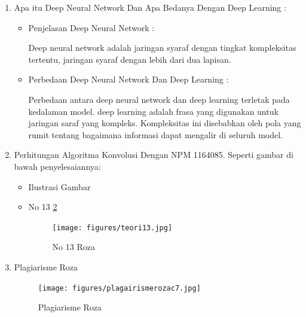 \begin{enumerate}
\item Apa itu Deep Neural Network Dan Apa Bedanya Dengan Deep Learning :
\begin{itemize}
\item Penjelasan Deep Neural Network : 
\par  Deep neural network adalah jaringan syaraf dengan tingkat kompleksitas tertentu, jaringan syaraf dengan lebih dari dua lapisan.
\par
\item Perbedaan Deep Neural Network Dan Deep Learning :
\par Perbedaan antara deep neural network dan deep learning terletak pada kedalaman model. deep learning adalah frasa yang digunakan untuk jaringan saraf yang kompleks. Kompleksitas ini disebabkan oleh pola yang rumit tentang bagaimana informasi dapat mengalir di seluruh model.
\end{itemize}
\par
\par

\item Perhitungan Algoritma Konvolusi Dengan NPM 1164085. Seperti gambar di bawah penyelesaiannya:
\begin{itemize}
\item Ilustrasi Gambar
\item No 13 \ref{teori13}
\begin{figure}[!hbtp]
\centering
\texttt{[image: figures/teori13.jpg]}
\caption{No 13 Roza}
\label{teori13}
\end{figure}
\par
\end{itemize}
\par
\par
\item Plagiarisme Roza
\begin{figure}[!hbtp]
\centering
\texttt{[image: figures/plagairismerozac7.jpg]}
\caption{Plagiarisme Roza}
\label{teori13}
\end{figure}
\par
\end{enumerate}
\par
\par

